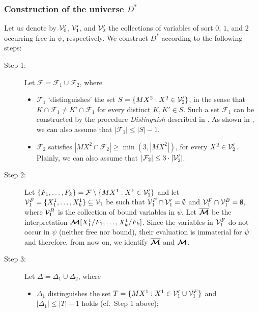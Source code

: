 \documentclass{fundam}
\newcommand{\model}{\ensuremath{\mbox{\boldmath $\mathcal{M}$}}\xspace}
\begin{document}
\subsubsection{Construction of the universe $D^*$}
\label{ssseUniv}
Let us denote by ${\cal V}_0'$, ${\cal V}_1'$, and ${\cal V}_2'$ the
collections of variables of sort $0$, $1$, and $2$ occurring free in
$\psi$, respectively.  We construct $D^*$ according to the following
steps:
\begin{description}
\item [Step 1:] Let $\mathcal{F} = \mathcal{F}_1 \cup \mathcal{F}_2$,
where
\begin{itemize}
\item $\mathcal{F}_1$ `distinguishes' the set $S = \{MX^{2} : X^{2}
\in {\cal V}_2'\}$, in the sense that $K \cap \mathcal{F}_1 \neq K'
\cap \mathcal{F}_1$ for every distinct $K,K' \in S$.  Such a set
$\mathcal{F}_1$ can be constructed by the procedure {\em Distinguish}
described in \cite{CanFer1995}.  As shown in \cite{CanFer1995}, we can
also assume that $|\mathcal{F}_1| \leq |S| -1$.

\item $\mathcal{F}_2$ satisfies $|MX^{2} \cap \mathcal{F}_2| \geq
\min(3, |MX^{2}|)$, for every $X^{2} \in {\cal V}_2'$. Plainly, we
can also assume that $|\mathcal{F}_2| \leq 3 \cdot |{\cal V}_2'|$.
\end{itemize}

\item [Step 2:] Let $\{F_1,\ldots,F_k\} = \mathcal{F} \setminus \{MX^1
: X^1 \in {\cal V}_1'\}$ and let ${\cal V}_{1}^{F} =
\{X_{1}^{1},\ldots,X_{k}^{1}\}\subseteq {\cal V}_1$ be such that
${\cal V}_{1}^{F} \cap {\cal V}_1' = \emptyset$ and ${\cal V}_{1}^{F}
\cap {\cal V}_{1}^{B} = \emptyset$, where ${\cal V}_{1}^{B}$ is the
collection of bound variables in $\psi$.  Let $\overline{\model}$ be
the interpretation $\model[X_{1}^{1}/F_1,\ldots, X_{k}^{1}/F_k]$.
Since the variables in ${\cal V}_{1}^{F}$ do not occur in $\psi$
(neither free nor bound), their evaluation is immaterial for $\psi$
and therefore, from now on, we identify $\overline{\model}$ and
$\model$.

\item [Step 3:] Let $\Delta = \Delta_{1} \cup \Delta_{2}$, where
\begin{itemize}
\item $\Delta_{1}$ distinguishes the set $T = \{MX^1 : X^1 \in {\cal
V}_1'\cup {\cal V}_1^F\}$ and $|\Delta_{1}| \leq |T| -1$ holds (cf.\
Step 1 above);


\end{itemize}
\end{description}
\end{document}
